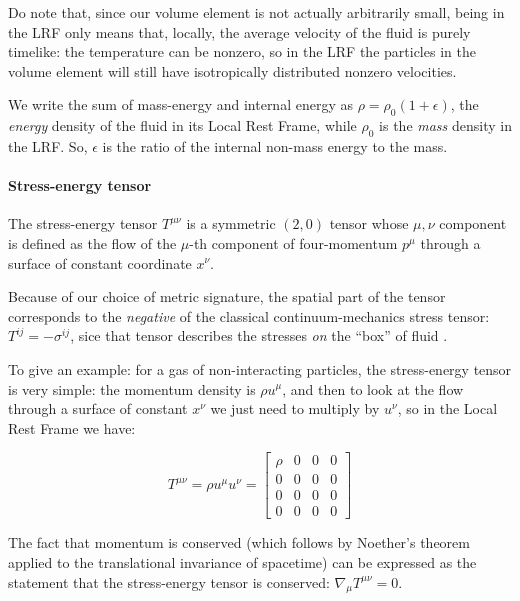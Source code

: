 \documentclass[main.tex]{subfiles}
\begin{document}
Do note that, since our volume element is not actually arbitrarily small, being in the LRF only means that, locally, the average velocity of the fluid is purely timelike: the temperature can be nonzero, so in the LRF the particles in the volume element will still have isotropically distributed nonzero velocities.

We write the sum of mass-energy and internal energy as $\rho = \rho_0 (1+\epsilon)$, the \emph{energy} density of the fluid in its Local Rest Frame, while \(\rho_0\) is the \emph{mass} density in the LRF.
So, $\epsilon$ is the ratio of the internal non-mass energy to the mass.

\paragraph{Stress-energy tensor} \label{par:stress-energy-tensor}

The stress-energy tensor \(T^{\mu\nu}\) is a symmetric \((2,0)\) tensor whose \(\mu, \nu\) component is defined as the flow of the \(\mu\)-th component of four-momentum \(p^\mu\) through a surface of constant coordinate \(x^\nu\).

Because of our choice of metric signature, the spatial part of the tensor corresponds to the \emph{negative} of the classical continuum-mechanics stress tensor: \(T^{ij} = - \sigma^{ij}\), sice that tensor describes the stresses \emph{on} the ``box'' of fluid \cite[]{Moretti:2016}.

To give an example: for a gas of non-interacting particles, the stress-energy tensor is very simple: the momentum density is \(\rho u^\mu\), and then to look at the flow through a surface of constant \(x^\nu\) we just need to multiply by \(u^\nu\), so in the Local Rest Frame we have:

\begin{equation}
    T^{\mu\nu} = \rho u^\mu u^\nu = \begin{bmatrix}
    \rho    & 0  &  0 & 0 \\
      0 & 0  & 0  & 0 \\
      0 & 0  & 0  & 0 \\
      0 & 0  & 0  & 0
    \end{bmatrix}
\end{equation}

The fact that momentum is conserved (which follows by Noether's theorem applied to the translational invariance of spacetime) can be expressed as the statement that the stress-energy tensor is conserved: \(\nabla_\mu T^{\mu\nu} = 0\).
\end{document}
